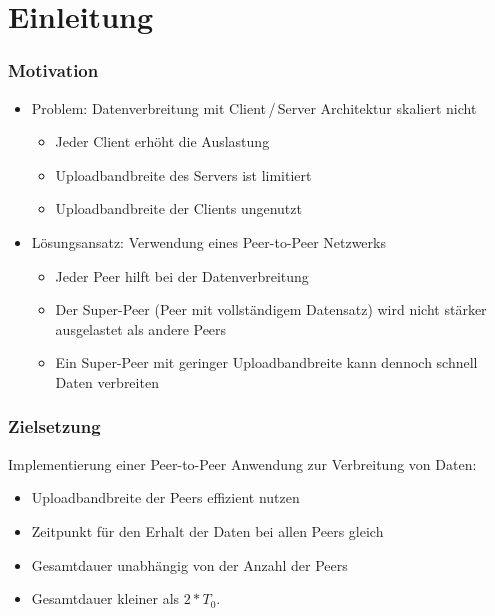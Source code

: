 \section{Einleitung}

\begin{frame}
  \frametitle{Motivation}  
  \begin{itemize}
    \item Problem: Datenverbreitung mit Client\,/\,Server Architektur skaliert nicht
    \vspace{1mm}
    \begin{itemize}
      \item Jeder Client erhöht die Auslastung
      \vspace{1mm}
      \item Uploadbandbreite des Servers ist limitiert        
      \vspace{1mm}
      \item Uploadbandbreite der Clients ungenutzt
    \end{itemize}

    \vspace{2mm}

    \item Lösungsansatz: Verwendung eines Peer-to-Peer Netzwerks
    \vspace{1mm}
    \begin{itemize}
      \item Jeder Peer hilft bei der Datenverbreitung
      \vspace{1mm}
      \item Der Super-Peer (Peer mit vollständigem Datensatz) wird nicht stärker ausgelastet als andere Peers
      \vspace{1mm}
      \item Ein Super-Peer mit geringer Uploadbandbreite kann dennoch schnell Daten verbreiten
    \end{itemize}    
  \end{itemize}
\end{frame}


\begin{frame}
  \frametitle{Zielsetzung}
    Implementierung einer Peer-to-Peer Anwendung zur Verbreitung von Daten:
    \vspace{1mm}
    \begin{itemize}
      \item Uploadbandbreite der Peers effizient nutzen
      \item Zeitpunkt für den Erhalt der Daten bei allen Peers gleich
      \item Gesamtdauer unabhängig von der Anzahl der Peers
      \item Gesamtdauer kleiner als $2 * T_0$.
    \end{itemize}
\end{frame}